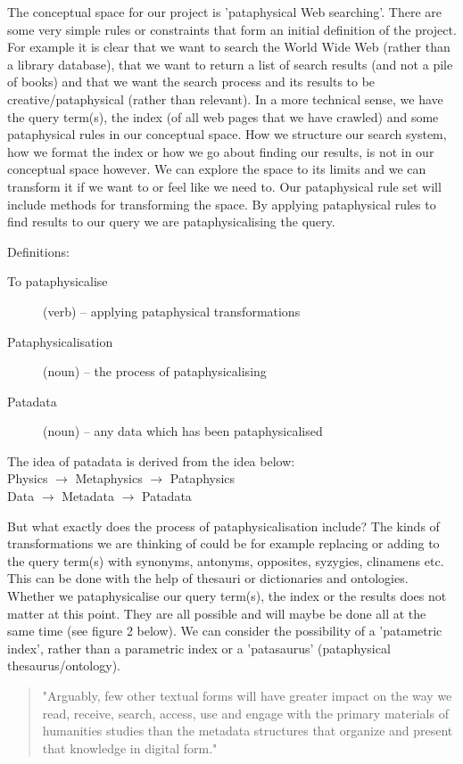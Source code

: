 The conceptual space for our project is 'pataphysical Web searching'. There are some very simple rules or constraints that form an initial definition of the project. For example it is clear that we want to search the World Wide Web (rather than a library database), that we want to return a list of search results (and not a pile of books) and that we want the search process and its results to be creative/pataphysical (rather than relevant).  In a more technical sense, we have the query term(s), the index (of all web pages that we have crawled) and some pataphysical rules in our conceptual space. How we structure our search system, how we format the index or how we go about finding our results, is not in our conceptual space however. We can explore the space to its limits and we can transform it if we want to or feel like we need to. Our pataphysical rule set will include methods for transforming the space. By applying pataphysical rules to find results to our query we are pataphysicalising the query.

Definitions:
\begin{description}
  \item [To pataphysicalise] (verb) – applying pataphysical transformations
  \item [Pataphysicalisation] (noun) – the process of pataphysicalising
  \item [Patadata] (noun) – any data which has been pataphysicalised
\end{description}

The idea of patadata is derived from the idea below:\\
Physics $\to$ Metaphysics $\to$ Pataphysics\\
Data $\to$ Metadata $\to$ Patadata

But what exactly does the process of pataphysicalisation include? The kinds of transformations we are thinking of could be for example replacing or adding to the query term(s) with synonyms, antonyms, opposites, syzygies, clinamens etc. This can be done with the help of thesauri or dictionaries and ontologies. Whether we pataphysicalise our query term(s), the index or the results does not matter at this point. They are all possible and will maybe be done all at the same time (see figure 2 below). We can consider the possibility of a 'patametric index', rather than a parametric index or a 'patasaurus' (pataphysical thesaurus/ontology).

\begin{quote}
  "Arguably, few other textual forms will have greater impact on the way we read, receive, search, access, use and engage with the primary materials of humanities studies than the metadata structures that organize and present that knowledge in digital form." \citep[p.9]{Drucker2009}
\end{quote}


